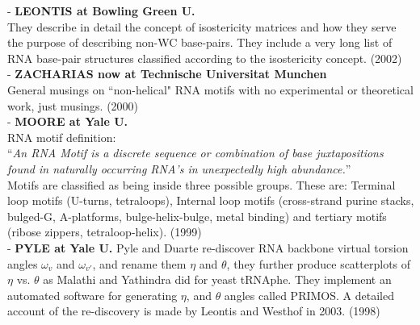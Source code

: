 - \textbf{LEONTIS at Bowling Green U.}\\
They describe in detail the concept of isostericity matrices and how
they serve the purpose of describing non-WC base-pairs.
They include a very long list of RNA base-pair structures classified
according to the isostericity concept. (2002)
\cite{leontis2002}\\

- \textbf{ZACHARIAS now at Technische Universitat Munchen}\\
General musings on ``non-helical" RNA motifs with no experimental or
theoretical work, just musings. (2000)
\cite{zacharias2000a}\\

- \textbf{MOORE at Yale U.}\\
RNA motif definition:\\
``\textit{An RNA Motif is a discrete sequence or combination of base
  juxtapositions found in naturally occurring RNA's in unexpectedly
  high abundance.}''\\
Motifs are classified as being inside three possible groups. These
are: Terminal loop motifs (U-turns, tetraloops), Internal loop
motifs (cross-strand purine stacks, bulged-G, A-platforms,
bulge-helix-bulge, metal binding) and tertiary motifs (ribose zippers,
tetraloop-helix). (1999)
\cite{moore1999}\\

- \textbf{PYLE at Yale U.}
Pyle and Duarte re-discover RNA backbone virtual torsion angles
$\omega_{v}$ and $\omega_{v'}$, and rename them $\eta$ and $\theta$,
they further produce scatterplots of $\eta$ vs. $\theta$ as Malathi
and Yathindra did for yeast tRNAphe. They implement an automated
software for generating $\eta$, and $\theta$ angles called PRIMOS.  A detailed
account of the re-discovery is made by Leontis and Westhof in 2003. (1998) 
\cite{duarte1998}\\





